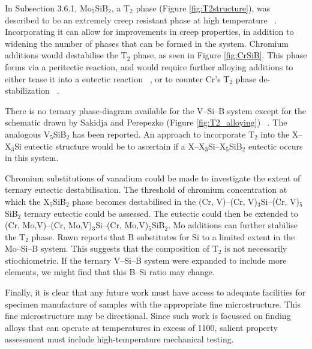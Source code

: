 In Subsection 3.6.1, Mo$_5$SiB$_2$, a T$_2$ phase (Figure \ref{fig:T2structure}), was described to be an extremely creep resistant phase at high temperature ~\cite{rawn01}.  Incorporating it can allow for improvements in creep properties, in addition to widening the number of phases that can be formed in the system.  Chromium additions would destabilise the T$_2$ phase, as seen in Figure \ref{fig:CrSiB}.  This phase forms via a peritectic reaction, and would require further alloying additions to either tease it into a eutectic reaction ~\cite{sakidja05}, or to counter Cr's T$_2$ phase de-stabilization ~\cite{nowotny58}. 

There is no ternary phase-diagram available for the V--Si--B system except for the schematic drawn by Sakidja and Perepezko (Figure \ref{fig:T2_alloying}) ~\cite{sakidja05}.  The analogous V$_5$SiB$_2$ has been reported.  An approach to incorporate T$_2$ into the X--X$_3$Si eutectic structure would be to ascertain if a X--X$_3$Si--X$_5$SiB$_2$ eutectic occurs in this system. 

Chromium substitutions of vanadium could be made to investigate the extent of ternary eutectic destabilisation.  The threshold of chromium concentration at which the X$_5$SiB$_2$ phase becomes destabilised in the (Cr, V)--(Cr, V)$_3$Si--(Cr, V)$_5$SiB$_2$ ternary eutectic could be assessed.  The eutectic could then be extended to (Cr, Mo,V)--(Cr, Mo,V)$_3$Si--(Cr, Mo,V)$_5$SiB$_2$.  Mo additions can further stabilise the T$_2$ phase.  Rawn reports that B substitutes for Si to a limited extent in the Mo--Si--B system.  This suggests that the composition of T$_2$ is not necessarily stiochiometric.  If the ternary V--Si--B system were expanded to include more elements, we might find that this B--Si ratio may change.

Finally, it is clear that any future work must have access to adequate facilities for specimen manufacture of samples with the appropriate fine microstructure. This fine microstructure may be directional.  Since such work is focussed on finding alloys that can operate at temperatures in excess of 1100\celsius, salient property assessment must include high-temperature mechanical testing.

